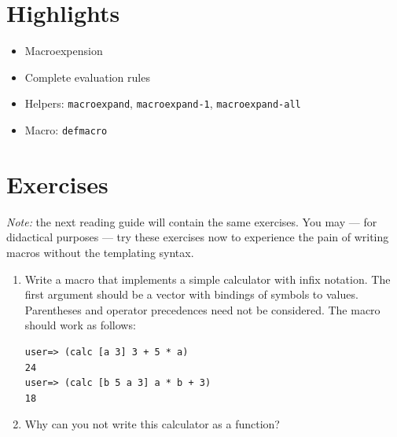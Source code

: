 \documentclass[11pt,a4paper]{article}
\begin{document}
\section{Highlights}

\begin{itemize}
    \item Macroexpension
    \item Complete evaluation rules
    \item Helpers: \verb|macroexpand|, \verb|macroexpand-1|, \verb|macroexpand-all|
    \item Macro: \verb|defmacro|
\end{itemize}



\section{Exercises}

\emph{Note:} the next reading guide will contain the same exercises.
You may --- for didactical purposes --- try these exercises now 
to experience the pain of writing macros
without the templating syntax.

\begin{exercise}[Macro]
\begin{enumerate}[label=\alph*)]
\item
Write a macro that implements a simple calculator with infix notation. The first argument should be a vector with bindings of symbols to values. Parentheses and operator precedences need not be considered. The macro should work as follows:
\begin{verbatim}
user=> (calc [a 3] 3 + 5 * a)
24
user=> (calc [b 5 a 3] a * b + 3)
18
\end{verbatim}
\item Why can you not write this calculator as a function?
\end{enumerate}
\end{exercise}
\end{document}
